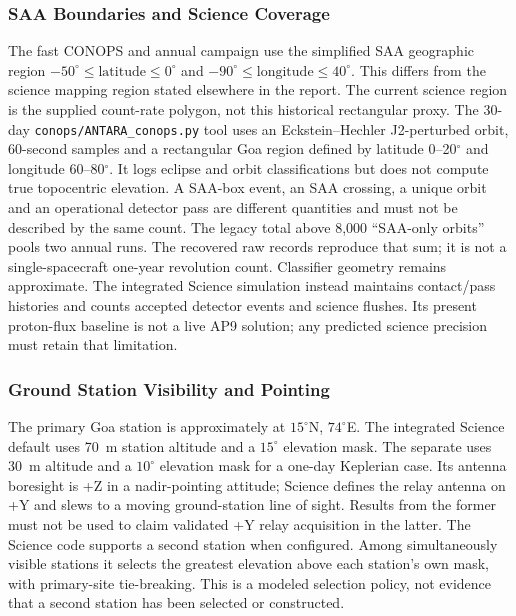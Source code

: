 \subsubsection{SAA Boundaries and Science Coverage}\label{app:saa-support}
The fast CONOPS and annual campaign use the simplified SAA geographic region $-50^\circ\leq\mathrm{latitude}\leq0^\circ$ and $-90^\circ\leq\mathrm{longitude}\leq40^\circ$. This differs from the science mapping region stated elsewhere in the report. The current science region is the supplied count-rate polygon, not this historical rectangular proxy.
The 30-day \texttt{conops/ANTARA\_conops.py} tool uses an Eckstein--Hechler J2-perturbed orbit, 60-second samples and a rectangular Goa region defined by latitude 0--20$^\circ$ and longitude 60--80$^\circ$. It logs eclipse and orbit classifications but does not compute true topocentric elevation. A SAA-box event, an SAA crossing, a unique orbit and an operational detector pass are different quantities and must not be described by the same count. The legacy total above 8,000 ``SAA-only orbits'' pools two annual runs. The recovered raw records reproduce that sum; it is not a single-spacecraft one-year revolution count. Classifier geometry remains approximate.
The integrated Science simulation instead maintains contact/pass histories and counts accepted detector events and science flushes. Its present proton-flux baseline is not a live AP9 solution; any predicted science precision must retain that limitation.
\subsubsection{Ground Station Visibility and Pointing}\label{app:gs-support}
The primary Goa station is approximately at $15^\circ$N, $74^\circ$E. The integrated Science default uses 70~m station altitude and a $15^\circ$ elevation mask. The separate  uses 30~m altitude and a $10^\circ$ elevation mask for a one-day Keplerian case. Its antenna boresight is +Z in a nadir-pointing attitude; Science defines the relay antenna on +Y and slews to a moving ground-station line of sight. Results from the former must not be used to claim validated +Y relay acquisition in the latter.
The Science code supports a second station when configured. Among simultaneously visible stations it selects the greatest elevation above each station's own mask, with primary-site tie-breaking. This is a modeled selection policy, not evidence that a second station has been selected or constructed.
